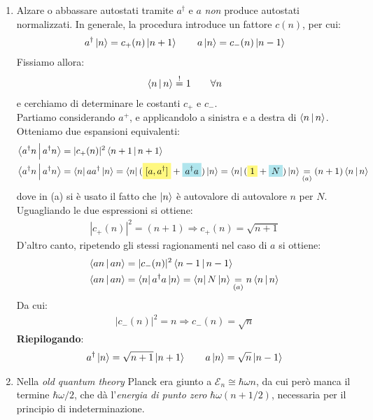 \documentclass[../../FisicaTeorica.tex]{subfiles}
\begin{document}
\begin{enumerate}
\item Alzare o abbassare autostati tramite $a^\dag$ e $a$ \textit{non} produce autostati normalizzati. In generale, la procedura introduce un fattore $c(n)$, per cui:
\begin{align*}
a^\dag \Ket{n} = c_+(n) \Ket{n+1} \qquad a\Ket{n}=c_-(n)\Ket{n-1}
\end{align*}
Fissiamo allora:
\begin{align*}
\Braket{n|n} \overset{!}{=}1 \qquad \forall n
\end{align*}
e cerchiamo di determinare le costanti $c_+$ e $c_-$.\\
Partiamo considerando $a^+$, e applicandolo a sinistra e a destra di $\Braket{n|n}$. Otteniamo due espansioni equivalenti:
\begin{align*}
\braket{a^\dag n | a^\dag n} &= |c_+(n)|^2 \braket{n+1|n+1}\\
\braket{a^\dag n | a^\dag n} &= \bra{n}a a^\dag \ket{n} = \bra{n}(\hlc{Yellow}{[a,a^\dag]}+\hlc{SkyBlue}{a^\dag a}) \ket{n} = \bra{n}(\hlc{Yellow}{1}+\hlc{SkyBlue}{N})\ket{n} \underset{(a)}{=} (n+1)\braket{n|n}
\end{align*} 
dove in (a) si è usato il fatto che $\Ket{n}$ è autovalore di autovalore $n$ per $N$.\\
Uguagliando le due espressioni si ottiene:
\begin{align*}
|c_+(n)|^2 = (n+1) \Rightarrow c_+(n) = \sqrt{n+1}
\end{align*}
D'altro canto, ripetendo gli stessi ragionamenti nel caso di $a$ si ottiene:
\begin{align*}
\Braket{an|an} &= |c_-(n)|^2 \Braket{n-1|n-1}\\
\Braket{an|an} &= \Bra{n}a^\dag a \Ket{n} = \Bra{n}N\Ket{n} \underset{(a)}{=} n\Braket{n|n}
\end{align*}
Da cui:
\begin{align*}
|c_-(n)|^2 = n \Rightarrow c_-(n) = \sqrt{n}
\end{align*}
\textbf{Riepilogando}:
\begin{align}
a^\dag \Ket{n} = \sqrt{n+1}\Ket{n+1}\qquad a\Ket{n}=\sqrt{n}\Ket{n-1}
\label{eqn:normalizzazione-costruzione-distruzione}
\end{align}
\item Nella \textit{old quantum theory} Planck era giunto a $\mathcal{E}_n \cong \hbar \omega n$, da cui però manca il termine $\hbar \omega/2$, che dà l'\textit{energia di punto zero} $\hbar \omega (n+1/2)$, necessaria per il principio di indeterminazione.\\

\end{enumerate}
\end{document}

